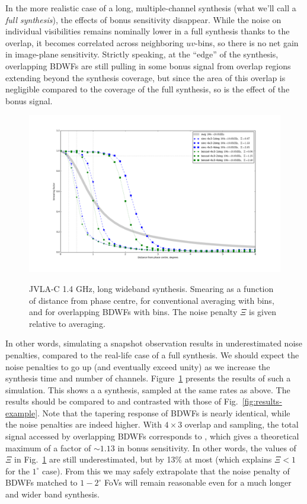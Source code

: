 \documentclass[useAMS,usenatbib]{mn2e}
\begin{document}
In the more realistic case of a long, multiple-channel synthesis (what we'll call a \emph{full synthesis}), the
effects of bonus sensitivity disappear. While the noise on individual visibilities remains nominally lower in a full 
synthesis thanks to the overlap, it becomes correlated across neighboring $uv$-bins, so there is no net gain 
in image-plane sensitivity. Strictly speaking, at the ``edge'' of the synthesis, overlapping BDWFs are still pulling 
in some bonus signal from overlap regions extending beyond the synthesis coverage, but since the area of this 
overlap is negligible compared to the coverage of the full synthesis, so is the effect of the bonus signal.

\begin{figure}
\includegraphics[width=.9\textwidth]{./Figures/suppression-longsynth.png}\\
\caption{JVLA-C 1.4 GHz, long wideband synthesis. Smearing as a function of distance from phase centre, 
for conventional averaging with  bins, and for overlapping BDWFs with  bins.
The noise penalty $\Xi$ is given relative to  averaging.}
\label{fig:results-longsynth}
\end{figure}

In other words, simulating a snapshot observation results in underestimated noise penalties, compared to the
real-life case of a full synthesis. We should expect the noise penalties to go up (and eventually exceed unity) as 
we increase the synthesis time and number of channels. Figure~\ref{fig:results-longsynth} presents the results of such 
a simulation. This shows a a  synthesis, sampled at the same rates as above. The results should be 
compared to and contrasted with those of Fig.~\ref{fig:results-example}. Note that the tapering response of BDWFs is 
nearly identical, while the noise penalties are indeed higher. With $4\times3$ overlap and  sampling, 
the total signal accessed by overlapping BDWFs corresponds to , which gives a theoretical maximum of 
a factor of $\sim1.13$ in bonus sensitivity. In other words, the values of $\Xi$ in Fig.~\ref{fig:results-longsynth}
are still underestimated, but by 13\% at most (which explains $\Xi<1$ for the $1^\circ$ case). From this we may safely
extrapolate that the noise penalty of BDWFs matched to $1-2^\circ$ FoVs will remain reasonable even for a much longer 
and wider band synthesis.
\end{document}
